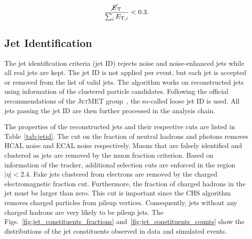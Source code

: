 \begin{equation}
    \frac{\cancel{E}_{\mathrm{T}}}{\sum_i E_{\mathrm{T},i}} < 0.3.
\end{equation}

\subsection{Jet Identification}

The jet identification criteria (jet ID) rejects noise and noise-enhanced jets
while all real jets are kept. The jet ID is not applied per event, but each jet
is accepted or removed from the list of valid jets. The algorithm works on
reconstructed jets using information of the clustered particle candidates.
Following the official recommendations of the \textsc{JetMET}
group~\cite{jetmet:jetid}, the so-called loose jet ID is used. All jets passing the jet ID
are then further processed in the analysis chain. 

The properties of the reconstructed jets and their respective cuts are listed in
Table~\ref{tab:jetid}. The cut on the fraction of neutral hadrons and photons
removes HCAL noise and ECAL noise respectively. Muons that are falsely
identified and clustered as jets are removed by the muon fraction criterion.
Based on information of the tracker, additional selection cuts are enforced in
the region $|\eta| < 2.4$. Fake jets clustered from electrons are removed by the
charged electromagnetic fraction cut. Furthermore, the fraction of charged hadrons in the
jet must be larger than zero. This cut is important since the CHS algorithm
removes charged particles from pileup vertices. Consequently, jets without any
charged hadrons are very likely to be pileup jets. The
Figs.~\ref{fig:jet_constituents_fractions} and~\ref{fig:jet_constituents_counts}
show the distributions of the jet constituents observed in data and simulated
events.

